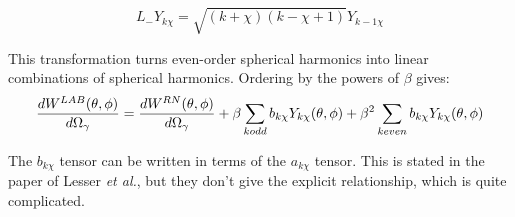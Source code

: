 \begin{equation}
L_- Y_{k\chi} = \sqrt{ (k + \chi)(k - \chi + 1)} Y_{k-1 \chi}
\end{equation}

\noindent This transformation turns even-order spherical harmonics into
linear combinations of spherical harmonics. Ordering by the powers of
$\beta$ gives:\\

\begin{equation}
{dW^{LAB}(\theta, \phi) \over d\Omega_\gamma} =
{dW^{RN}(\theta, \phi) \over d\Omega_\gamma} +
\beta \sum_{k odd} b_{k\chi} Y_{k\chi}(\theta, \phi) +
\beta^2 \sum_{k even} b_{k\chi} Y_{k\chi}(\theta, \phi)
\end{equation}

\noindent The $b_{k\chi}$ tensor can be written in terms of the $a_{k\chi}$
tensor. This is stated in the paper of Lesser {\em et al.}, but they don't
give the explicit relationship, which is quite complicated.\\


